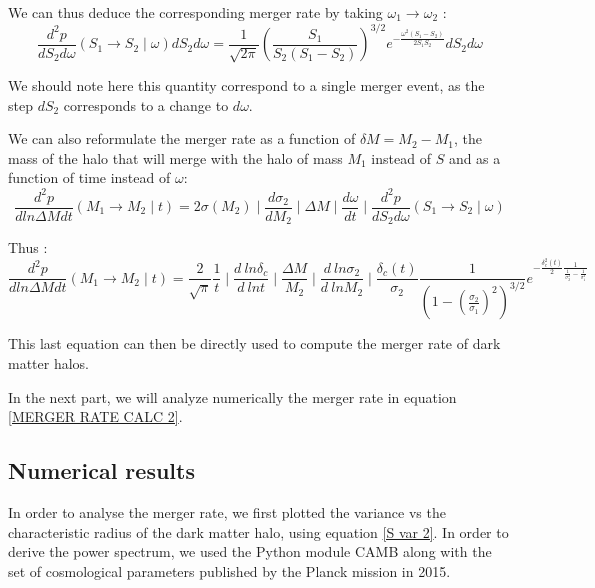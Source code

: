 We can thus deduce the corresponding merger rate by taking $\omega_1 \rightarrow \omega_2$ :
\begin{equation}
\label{MERGER RATE}
\frac{d^2p}{dS_2 d\omega} (S_1 \rightarrow S_2 \mid \omega) dS_2 d\omega = \frac{1}{\sqrt{2\pi}} \left(\frac{S_1}{S_2(S_1 - S_2)}\right)^{3/2} e^{-\frac{\omega^2 (S_1 - S_2)}{2S_1 S_2} } dS_2 d\omega
\end{equation}

We should note here this quantity correspond to a single merger event, as the step $dS_2$ corresponds to a change to $d\omega$.

We can also reformulate the merger rate as a function of $\delta M = M_2 - M_1$, the mass of the halo that will merge with the halo of mass $M_1$ instead of $S$ and as a function of time instead of $\omega$:
\begin{equation}
\label{MERGER RATE CALC}
\frac{d^2p}{d ln \Delta M dt} (M_1 \rightarrow M_2 \mid t) = 2\sigma(M_2) \mid \frac{d\sigma_2}{d M_2} \mid \Delta M \mid \frac{d\omega}{dt} \mid \frac{d^2p}{dS_2 d\omega} (S_1 \rightarrow S_2 \mid \omega) 
\end{equation}

Thus :
\begin{equation}
\label{MERGER RATE CALC 2}
\frac{d^2p}{d ln \Delta M dt} (M_1 \rightarrow M_2 \mid t)=  \frac{2}{\sqrt{\pi}} \frac{1}{t} \mid \frac{d \ ln \delta_c}{d \ ln t}\mid \frac{\Delta M}{M_2} \mid \frac{d \ ln \sigma_2}{d \ ln M_2} \mid \frac{\delta_c (t)}{\sigma_2} \frac{1}{\left(1 - (\frac{\sigma_2}{\sigma_1})^2 \right)^{3/2}} e^{-\frac{\delta_c^2 (t)}{2} \frac{1}{\frac{1}{\sigma_2^2} - \frac{1}{\sigma^2_1}} }
\end{equation}

This last equation can then be directly used to compute the merger rate of dark matter halos. 

In the next part, we will analyze numerically the merger rate in equation \ref{MERGER RATE CALC 2}.

\subsection{Numerical results}



In order to analyse the merger rate, we first plotted the variance vs the characteristic radius of the dark matter halo, using equation \ref{S var 2}. In order to derive the power spectrum, we used the Python module CAMB along with the set of cosmological parameters published by the Planck mission in 2015.

